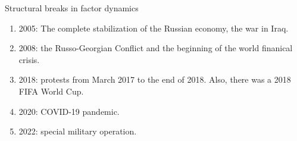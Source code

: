 \documentclass[aspectratio=169]{beamer}
\begin{document}
\begin{frame}{Structural breaks in factor dynamics}
    \begin{enumerate}
        \item 2005: The complete stabilization of the Russian economy, the war in Iraq. 
        \item 2008: the Russo-Georgian Conflict and the beginning of the world finanical crisis.
        \item 2018: protests from March 2017 to the end of 2018. Also, there was a 2018 FIFA World Cup.
        \item 2020: COVID-19 pandemic.
        \item 2022: special military operation.
    \end{enumerate}

\end{frame}
\end{document}
